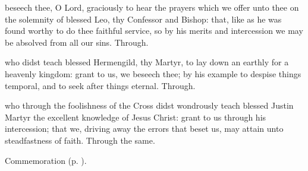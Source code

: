 {} beseech thee, O Lord, graciously to hear the prayers which we offer unto thee on the solemnity of blessed Leo, thy Confessor and Bishop: that, like as he was found worthy to do thee faithful service, so by his merits and intercession we may be absolved from all our sins. Through.





\memorialCollect
{} who didst teach blessed Hermengild, thy Martyr, to lay down an earthly for a heavenly kingdom: grant to us, we beseech thee; by his example to despise things temporal, and to seek after things eternal. Through.


\clearpage
{}

\memorialCollect
{} who through the foolishness of the Cross didst wondrously teach blessed Justin Martyr the excellent knowledge of Jesus Christ: grant to us through his intercession; that we, driving away the errors that beset us, may attain unto steadfastness of faith. Through the same.

\begin{rubric}
	Commemoration  (p. \pageref{TiburtiusCollect}).
\end{rubric}





